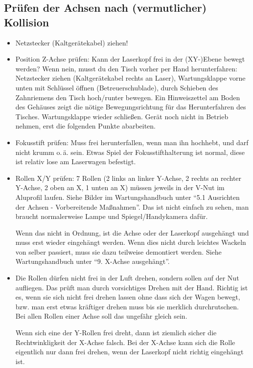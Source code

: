\documentclass{\basedir/fablab-document}
\begin{document}
\subsection{Prüfen der Achsen nach (vermutlicher) Kollision} \label{sec:wartung-ltt:kollision}
	\begin{itemize}
		\item Netzstecker (Kaltgerätekabel) ziehen!
		\item Position Z-Achse prüfen: Kann der Laserkopf frei in der (XY-)Ebene bewegt werden? Wenn nein, musst du den Tisch vorher per Hand herunterfahren: Netzstecker ziehen (Kaltgerätekabel rechts an Laser), Wartungsklappe vorne unten mit Schlüssel öffnen (Betreuerschublade), durch Schieben des Zahnriemens den Tisch hoch/runter bewegen. Ein Hinweiszettel am Boden des Gehäuses zeigt die nötige Bewegungsrichtung für das Herunterfahren des Tisches. Wartungsklappe wieder schließen. Gerät noch nicht in Betrieb nehmen, erst die folgenden Punkte abarbeiten.
		\item Fokusstift prüfen: Muss frei herunterfallen, wenn man ihn hochhebt, und darf nicht krumm o.\,ä. sein. Etwas Spiel der Fokusstifthalterung ist normal, diese ist relativ lose am Laserwagen befestigt.
		\item Rollen X/Y prüfen: 7 Rollen (2 links an linker Y-Achse, 2 rechts an rechter Y-Achse, 2 oben an X, 1 unten an X) müssen jeweils in der V-Nut im Aluprofil laufen. Siehe Bilder im Wartungshandbuch unter \enquote{5.1 Ausrichten der Achsen - Vorbereitende Maßnahmen}. Das ist nicht einfach zu sehen, man braucht normalerweise Lampe und Spiegel/Handykamera dafür.
		
		Wenn das nicht in Ordnung, ist die Achse oder der Laserkopf ausgehängt und muss erst wieder eingehängt werden. Wenn dies nicht durch leichtes Wackeln von selber passiert, muss sie dazu teilweise demontiert werden. Siehe Wartungshandbuch unter \enquote{9. X-Achse ausgehängt}.
		\item Die Rollen dürfen nicht frei in der Luft drehen, sondern sollen auf der Nut aufliegen. Das prüft man durch vorsichtiges Drehen mit der Hand. Richtig ist es, wenn sie sich nicht frei drehen lassen ohne dass sich der Wagen bewegt, bzw. man erst etwas kräftiger drehen muss bis sie merklich durchrutschen. 	Bei allen Rollen einer Achse soll das ungefähr gleich sein.
		
		Wenn sich eine der Y-Rollen frei dreht, dann ist ziemlich sicher die Rechtwinkligkeit der X-Achse falsch. Bei der X-Achse kann sich die Rolle eigentlich nur dann frei drehen, wenn der Laserkopf nicht richtig eingehängt ist.
		


\end{itemize}
\end{document}
